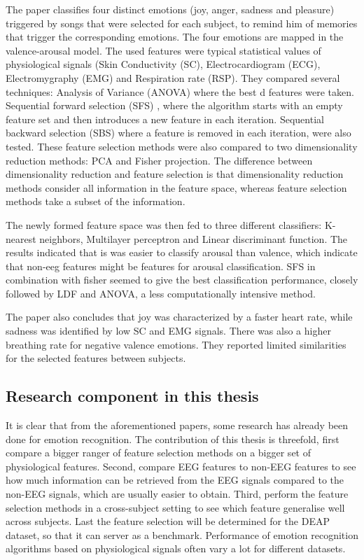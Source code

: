 The paper\citep{PhytoEm} classifies four distinct emotions (joy, anger, sadness and pleasure) triggered by songs that were selected for each subject, to remind him of memories that trigger the corresponding emotions. The four emotions are mapped in the valence-arousal model. The used features were typical statistical values of physiological signals (Skin Conductivity (SC), Electrocardiogram (ECG), Electromygraphy (EMG) and Respiration rate (RSP). They compared several techniques: Analysis of Variance (ANOVA)  where the best d features were taken. Sequential forward selection (SFS) , where the algorithm starts with an empty feature set and then introduces a new feature in each iteration. Sequential backward selection (SBS)  where a feature is removed in each iteration, were also tested. These feature selection methods were also compared to two dimensionality reduction methods: PCA and Fisher projection. The difference between dimensionality reduction and feature selection is that dimensionality reduction methods consider all information in the feature space, whereas feature selection methods take a subset of the information.

\npar

The newly formed feature space was then fed to three different classifiers: K-nearest neighbors, Multilayer perceptron and Linear discriminant function. The results indicated that is was easier to classify arousal than valence, which indicate that non-eeg features might be features for arousal classification. SFS in combination with fisher seemed to give the best classification performance, closely followed by LDF and ANOVA, a less computationally intensive method.

\npar

The paper also concludes that joy was characterized by a faster heart rate, while sadness was identified by low SC and EMG signals. There was also a higher breathing rate for negative valence emotions. They reported limited similarities for the selected features between subjects.

\subsection{Research component in this thesis}

It is clear that from the aforementioned papers, some research has already been done for emotion recognition. The contribution of this thesis is threefold, first compare a bigger ranger of feature selection methods on a bigger set of physiological features. Second, compare EEG features to non-EEG features to see how much information can be retrieved from the EEG signals compared to the non-EEG signals, which are usually easier to obtain. Third, perform the feature selection methods in a cross-subject setting to see which feature generalise well across subjects. Last the feature selection will be determined for the DEAP dataset, so that it can server as a benchmark. Performance of emotion recognition algorithms based on physiological signals often vary a lot for different datasets\citep{PhytoEm}.

